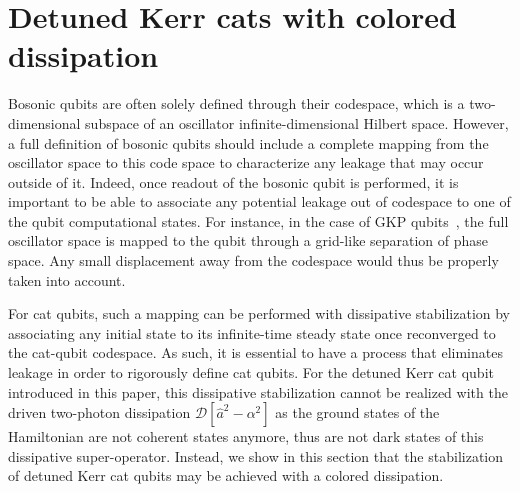 \section{\label{sec:colored}Detuned Kerr cats with colored dissipation}

Bosonic qubits are often solely defined through their codespace, which is a two-dimensional subspace of an oscillator infinite-dimensional Hilbert space. However, a full definition of bosonic qubits should include a complete mapping from the oscillator space to this code space to characterize any leakage that may occur outside of it. Indeed, once readout of the bosonic qubit is performed, it is important to be able to associate any potential leakage out of codespace to one of the qubit computational states. For instance, in the case of GKP qubits~\cite{Gottesman2001,CampagneIbarcq2020}, the full oscillator space is mapped to the qubit through a grid-like separation of phase space. Any small displacement away from the codespace would thus be properly taken into account.

For cat qubits, such a mapping can be performed with dissipative stabilization by associating any initial state to its infinite-time steady state once reconverged to the cat-qubit codespace. As such, it is essential to have a process that eliminates leakage in order to rigorously define cat qubits. For the detuned Kerr cat qubit introduced in this paper, this dissipative stabilization cannot be realized with the driven two-photon dissipation $\mathcal{D}[\hat{a}^2 - \alpha^2]$ as the ground states of the Hamiltonian are not coherent states anymore, thus are not dark states of this dissipative super-operator. Instead, we show in this section that the stabilization of detuned Kerr cat qubits may be achieved with a colored dissipation.

